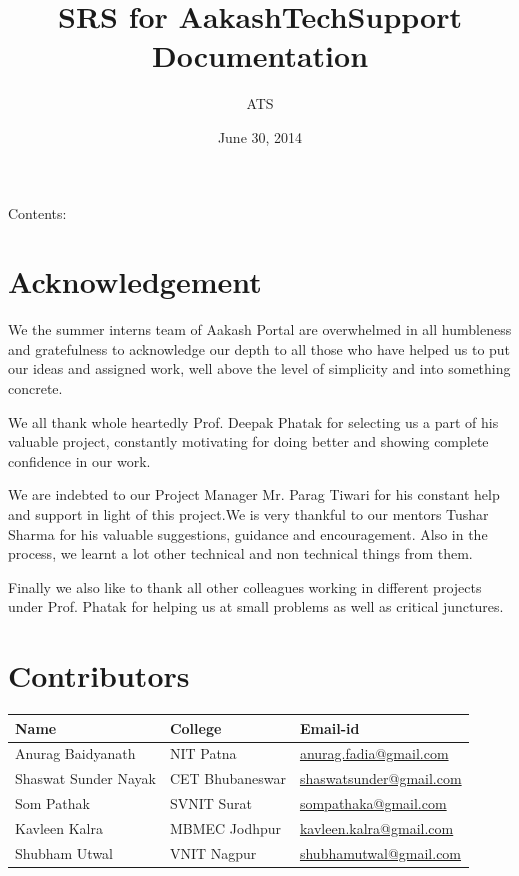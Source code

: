 \documentclass[letterpaper,10pt,english]{sphinxmanual}
\title{SRS for AakashTechSupport Documentation}
\date{June 30, 2014}
\author{ATS}
\begin{document}
\maketitle
\tableofcontents
{}\label{index::doc}


Contents:


\chapter{Acknowledgement}
\label{unifieddoc:acknowledgement}\label{unifieddoc::doc}\label{unifieddoc:welcome-to-srs-for-aakashtechsupport-s-documentation}
We the summer interns team of Aakash Portal are overwhelmed in all humbleness and gratefulness to acknowledge our depth to all those who have helped us to put our ideas and assigned work, well above the level of simplicity and into something concrete.

We all thank whole heartedly Prof. Deepak Phatak for selecting us a part of his valuable project, constantly motivating for doing better and showing complete confidence in our work.

We are indebted to our Project Manager Mr. Parag Tiwari for his constant help and support in light of this project.We is very thankful to our mentors Tushar Sharma for his valuable suggestions, guidance and encouragement. Also in the process, we learnt a lot other technical and non technical things from them.

Finally we also like to thank all other colleagues working in different projects under Prof. Phatak for helping us at small problems as well as critical junctures.


\chapter{Contributors}
\label{unifieddoc:contributors}
\begin{tabulary}{\linewidth}{|L|L|L|}
\hline
\textsf{\relax 
Name
} & \textsf{\relax 
College
} & \textsf{\relax 
Email-id
}\\
\hline
Anurag Baidyanath
 & 
NIT Patna
 & 
\href{mailto:anurag.fadia@gmail.com}{anurag.fadia@gmail.com}
\\

Shaswat Sunder Nayak
 & 
CET Bhubaneswar
 & 
\href{mailto:shaswatsunder@gmail.com}{shaswatsunder@gmail.com}
\\

Som Pathak
 & 
SVNIT Surat
 & 
\href{mailto:sompathaka@gmail.com}{sompathaka@gmail.com}
\\

Kavleen Kalra
 & 
MBMEC Jodhpur
 & 
\href{mailto:kavleen.kalra@gmail.com}{kavleen.kalra@gmail.com}
\\

Shubham Utwal
 & 
VNIT Nagpur
 & 
\href{mailto:shubhamutwal@gmail.com}{shubhamutwal@gmail.com}
\\
\hline\end{tabulary}
\end{document}
